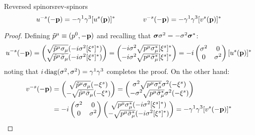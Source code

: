 \begin{lemma}{Reversed spinors}{rev-spinors}
  \begin{equation}
    u^{-s}(-\mathbf{p}) = - \gamma^1 \gamma^3 [u^s(\mathbf{p})]^*
    \qquad \qquad
    v^{-s}(-\mathbf{p}) = - \gamma^1 \gamma^3 [v^s(\mathbf{p})]^*
    \label{eq:2.38}
  \end{equation}

  \tcblower

  \begin{proof}
    Defining $ \tilde{p}^\mu \equiv (p^0, -\mathbf{p}) $ and recalling that $ \boldsymbol{\sigma} \sigma^2 = - \sigma^2 \boldsymbol{\sigma}^* $:
    \begin{equation*}
      u^{-s}(-\mathbf{p}) =
      \begin{pmatrix}
        \sqrt{\tilde{p}^\mu \sigma_\mu} (-i \sigma^2 [\xi^s]^*) \\
        \sqrt{\tilde{p}^\mu \bar{\sigma}_\mu} (-i \sigma^2 [\xi^s]^*)
      \end{pmatrix}
      =
      \begin{pmatrix}
        -i \sigma^2 \sqrt{p^\mu \sigma_\mu^*} [\xi^s]^* \\
        -i \sigma^2 \sqrt{p^\mu \bar{\sigma}_\mu^*} [\xi^s]^*
      \end{pmatrix}
      = -i \begin{pmatrix} \sigma^2 & 0 \\ 0 & \sigma^2 \end{pmatrix} [u^s(\mathbf{p})]^*
    \end{equation*}
    noting that $ i \operatorname{diag}(\sigma^2,\sigma^2) = \gamma^1 \gamma^3 $ completes the proof. On the other hand:
    \begin{equation*}
      \begin{split}
        v^{-s}(-\mathbf{p})
        &=
        \begin{pmatrix}
          \sqrt{\tilde{p}^\mu \sigma_\mu} (-\xi^s) \\
          - \sqrt{\tilde{p}^\mu \bar{\sigma}_\mu} (-\xi^s)
        \end{pmatrix}
        = 
        \begin{pmatrix}
          \sigma^2 \sqrt{p^\mu \sigma_\mu^*} \sigma^2 (-\xi^s) \\
          - \sigma^2 \sqrt{p^\mu \bar{\sigma}_\mu^*} \sigma^2 (-\xi^s)
        \end{pmatrix}\\
        &= -i \begin{pmatrix} \sigma^2 & 0 \\ 0 & \sigma^2 \end{pmatrix}
        \begin{pmatrix}
          \sqrt{p^\mu \sigma_\mu^*} (-i \sigma^2 [\xi^s]^*) \\
          - \sqrt{p^\mu \bar{\sigma}_\mu^*} (-i \sigma^2 [\xi^s]^*)
        \end{pmatrix}
        = - \gamma^1 \gamma^3 [v^s(-\mathbf{p})]^*
      \end{split}
    \end{equation*}
  \end{proof}
\end{lemma}

